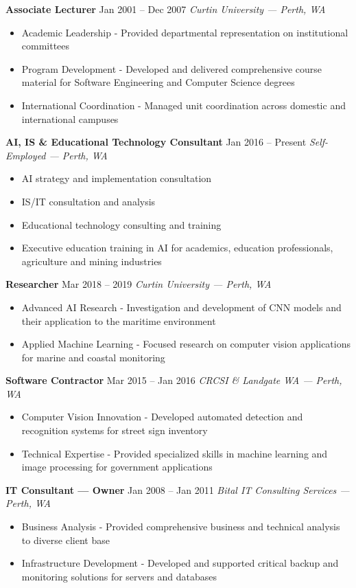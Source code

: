 \documentclass[11pt,a4paper]{article}
\begin{document}
\textbf{Associate Lecturer} \hfill Jan 2001 – Dec 2007
\textit{Curtin University — Perth, WA}
\begin{itemize}
\item Academic Leadership - Provided departmental representation on institutional committees
\item Program Development - Developed and delivered comprehensive course material for Software Engineering and Computer Science degrees
\item International Coordination - Managed unit coordination across domestic and international campuses
\end{itemize}

\textbf{AI, IS \& Educational Technology Consultant} \hfill Jan 2016 – Present
\textit{Self-Employed — Perth, WA}
\begin{itemize}
\item AI strategy and implementation consultation
\item IS/IT consultation and analysis
\item Educational technology consulting and training
\item Executive education training in AI for academics, education professionals, agriculture and mining industries
\end{itemize}

\textbf{Researcher} \hfill Mar 2018 – 2019
\textit{Curtin University — Perth, WA}
\begin{itemize}
\item Advanced AI Research - Investigation and development of CNN models and their application to the maritime environment
\item Applied Machine Learning - Focused research on computer vision applications for marine and coastal monitoring
\end{itemize}

\textbf{Software Contractor} \hfill Mar 2015 – Jan 2016
\textit{CRCSI \& Landgate WA — Perth, WA}
\begin{itemize}
\item Computer Vision Innovation - Developed automated detection and recognition systems for street sign inventory
\item Technical Expertise - Provided specialized skills in machine learning and image processing for government applications
\end{itemize}

\textbf{IT Consultant — Owner} \hfill Jan 2008 – Jan 2011
\textit{Bital IT Consulting Services — Perth, WA}
\begin{itemize}
\item Business Analysis - Provided comprehensive business and technical analysis to diverse client base
\item Infrastructure Development - Developed and supported critical backup and monitoring solutions for servers and databases
\end{itemize}
\end{document}
